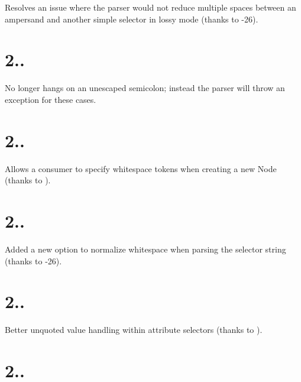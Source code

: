 
\begin{DoxyItemize}
\item Resolves an issue where the parser would not reduce multiple spaces between an ampersand and another simple selector in lossy mode (thanks to -\/26).
\end{DoxyItemize}

\section*{2..}


\begin{DoxyItemize}
\item No longer hangs on an unescaped semicolon; instead the parser will throw an exception for these cases.
\end{DoxyItemize}

\section*{2..}


\begin{DoxyItemize}
\item Allows a consumer to specify whitespace tokens when creating a new Node (thanks to ).
\end{DoxyItemize}

\section*{2..}


\begin{DoxyItemize}
\item Added a new option to normalize whitespace when parsing the selector string (thanks to -\/26).
\end{DoxyItemize}

\section*{2..}


\begin{DoxyItemize}
\item Better unquoted value handling within attribute selectors (thanks to ).
\end{DoxyItemize}

\section*{2..}


